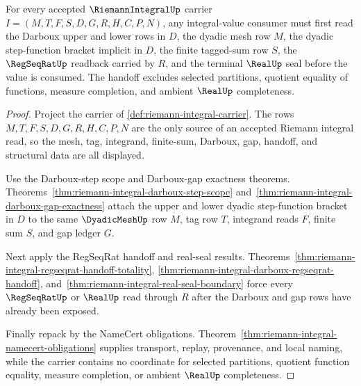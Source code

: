 \begin{theorem}
\label{thm:riemann-integral-regular-cauchy-darboux-handoff}
For every accepted $\RiemannIntegralUp$ carrier $I=(M,T,F,S,D,G,R,H,C,P,N)$, any integral-value consumer must first read the Darboux upper and lower rows in $D$, the dyadic mesh row $M$, the dyadic step-function bracket implicit in $D$, the finite tagged-sum row $S$, the $\RegSeqRatUp$ readback carried by $R$, and the terminal $\RealUp$ seal before the value is consumed. The handoff excludes selected partitions, quotient equality of functions, measure completion, and ambient $\RealUp$ completeness.
\end{theorem}
\begin{proof}
Project the carrier of \autoref{def:riemann-integral-carrier}. The rows $M,T,F,S,D,G,R,H,C,P,N$ are the only source of an accepted Riemann integral read, so the mesh, tag, integrand, finite-sum, Darboux, gap, handoff, and structural data are all displayed.

Use the Darboux-step scope and Darboux-gap exactness theorems. Theorems~\ref{thm:riemann-integral-darboux-step-scope} and~\ref{thm:riemann-integral-darboux-gap-exactness} attach the upper and lower dyadic step-function bracket in $D$ to the same $\DyadicMeshUp$ row $M$, tag row $T$, integrand reads $F$, finite sum $S$, and gap ledger $G$.

Next apply the RegSeqRat handoff and real-seal results. Theorems~\ref{thm:riemann-integral-regseqrat-handoff-totality}, \ref{thm:riemann-integral-darboux-regseqrat-handoff}, and~\ref{thm:riemann-integral-real-seal-boundary} force every $\RegSeqRatUp$ or $\RealUp$ read through $R$ after the Darboux and gap rows have already been exposed.

Finally repack by the NameCert obligations. Theorem~\ref{thm:riemann-integral-namecert-obligations} supplies transport, replay, provenance, and local naming, while the carrier contains no coordinate for selected partitions, quotient function equality, measure completion, or ambient $\RealUp$ completeness.
\end{proof}

